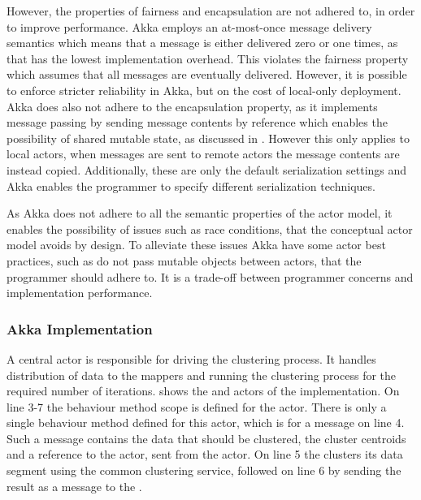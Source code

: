 However, the properties of fairness and encapsulation are not adhered to, in order to improve performance. Akka employs an at-most-once message delivery semantics which means that a message is either delivered zero or one times, as that has the lowest implementation overhead\cite[p. 27]{akkaDoc}. This violates the fairness property which assumes that all messages are eventually delivered. However, it is possible to enforce stricter reliability in Akka, but on the cost of local-only deployment\cite[p. 29]{akkaDoc}. Akka does also not adhere to the encapsulation property, as it implements message passing by sending message contents by reference which enables the possibility of shared mutable state, as discussed in . However this only applies to local actors, when messages are sent to remote actors the message contents are instead copied. Additionally, these are only the default serialization settings and Akka enables the programmer to specify different serialization techniques\cite[p. 219]{akkaDoc}.

As Akka does not adhere to all the semantic properties of the actor model, it enables the possibility of issues such as race conditions, that the conceptual actor model avoids by design. To alleviate these issues Akka have some actor best practices, such as do not pass mutable objects between actors, that the programmer should adhere to\cite[p. 12]{akkaDoc}. It is a trade-off between programmer concerns and implementation performance.


\subsubsection{Akka Implementation}
A central  actor is responsible for driving the clustering process. It handles distribution of data to the mappers and running the clustering process for the required number of iterations.  shows the  and  actors of the implementation. On line 3-7 the behaviour method scope is defined for the  actor. There is only a single behaviour method defined for this actor, which is for a  message on line 4. Such a message contains the data that should be clustered, the cluster centroids and a reference to the  actor, sent from the  actor. On line 5 the  clusters its data segment using the common clustering service, followed on line 6 by sending the result as a  message to the .

